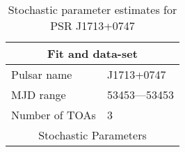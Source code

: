 \documentclass{article}
\begin{document}
\begin{table*}
\caption{Stochastic parameter estimates for PSR J1713+0747}
\begin{tabular}{ll}
\hline\hline
\multicolumn{2}{c}{Fit and data-set} \\ 
\hline
Pulsar name\dotfill & J1713+0747 \\ 
MJD range\dotfill & 53453---53453 \\ 
Number of TOAs\dotfill & 3 \\
\hline
\multicolumn{2}{c}{Stochastic Parameters} \\ 
\hline
\hline
\end{tabular}
\label{Table:J1713+0747}
\end{table*} 
\end{document}
